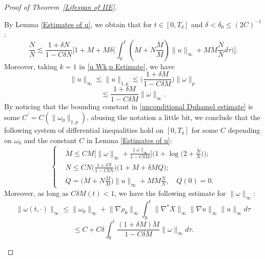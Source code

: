 \documentclass[10pt,a4paper]{amsart}
\begin{document}
\begin{proof}[Proof of Theorem~\ref{Lifespan of IIE}]
\begin{itemize}
\begin{equation}
\end{equation}
By Lemma \ref{Estimates of u}, we obtain that for $t\in [0,T_\delta]$ and $\delta<\delta_0\le (2C)^{-1}$:
\begin{equation*}
 \frac{\dot N}{N}\lesssim \frac{1+\delta N}{1-C\delta N} \bigg[1+M+  M\delta\Big(\int_0^t (\dot M+N\frac{\dot M}{M})\lVert u\rVert_\infty+M\dot M \frac{\dot N}{N}d\tau\Big) \bigg] . 
\end{equation*}
Moreover, taking $k=1$ in \eqref{u Wk,p Estimate}, we have
\begin{equation*}
\lVert u\rVert_\infty\lesssim \lVert u\rVert_{1,p}\lesssim \bigg(\frac{1+\delta M}{1-C\delta M}\bigg)\lVert\omega\rVert_p
\end{equation*}
\begin{equation*}
 \lesssim   \frac{1+\delta M}{1-C\delta M}\lVert\omega\rVert_\infty.
\end{equation*}
By noticing that the bounding constant in \eqref{unconditional Duhamel estimate} is some $C^\prime=C(\lVert\omega_0\rVert_{1,p})$, abusing the notation a little bit, we conclude that the following system of differential inequalities hold on $[0,T_\delta]$ for some $C$ depending on $\omega_0$ and the constant $C$ in Lemma \ref{Estimates of u}:
\begin{equation}\label{Differential Inequality System IIE}
\left\{
\begin{aligned}
&{\dot M}\le C  M\Big[\lVert\omega\rVert_\infty+\frac{\lVert\omega\rVert_\infty}{1-C\delta M}\Big]\Big(1+\log \Big(2+\frac{\dot N}{N}\Big)\Big);\\
&\dot N\le  CN\bigg(\frac{1+\delta N}{1-C\delta N}\bigg) \big(1+M+  \delta MQ \big);  \\
&\dot Q=  \Big(\dot M+N\frac{\dot M}{M}\Big)\lVert u\rVert_\infty+M\dot M \frac{\dot N}{N},\quad Q(0)=0 . 
\end{aligned}
\right.    
\end{equation}
Moreover, as long as $C\delta M(t)<1$, we have the following estimate for $\lVert\omega\rVert_\infty$:
\begin{equation*}
 \lVert\omega(t,\cdot)\rVert_\infty \le \lVert\omega_0\rVert_\infty+\lVert\nabla \rho_0\rVert_\infty\int_0^t \lVert\nabla^*X\rVert_\infty \lVert\nabla u\rVert_\infty \lVert u\rVert_\infty d\tau  
\end{equation*}
\begin{equation}\label{Linfty estimate for omega}
 \le   C+C\delta \int_0^t \frac{(1+\delta M)\dot M}{1-C\delta M}\lVert\omega\rVert_\infty d\tau.
\end{equation}


\end{itemize}
\end{proof}
\end{document}
